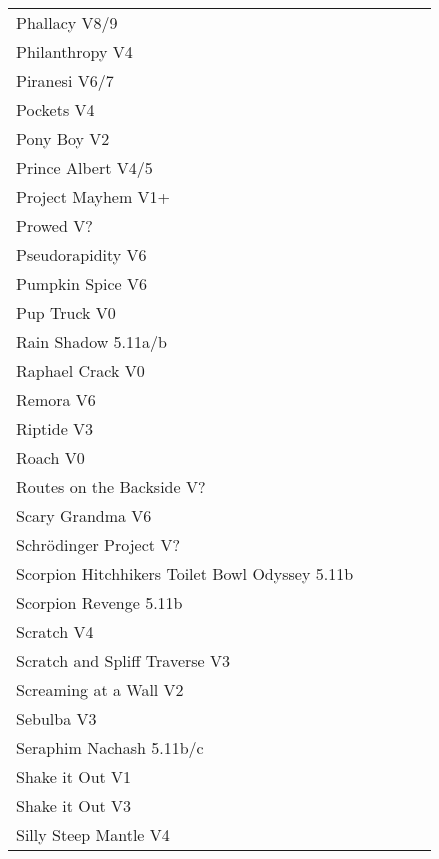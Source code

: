 \begin{flushleft}
\begin{center}
\begin{supertabular}{p{0.76\linewidth}p{0.08\linewidth}}
Phallacy V8/9 & \pageref{rt:Phallacy} \\
Philanthropy V4 & \pageref{rt:Philanthropy} \\
Piranesi V6/7 & \pageref{rt:Piranesi} \\
Pockets V4 & \pageref{rt:Pockets} \\
Pony Boy V2 & \pageref{rt:Pony Boy} \\
Prince Albert V4/5 & \pageref{rt:Prince Albert} \\
Project Mayhem V1+ & \pageref{rt:Project Mayhem} \\
Prowed V? & \pageref{vr:Prowed} \\
Pseudorapidity V6 & \pageref{rt:Pseudorapidity} \\
Pumpkin Spice V6 & \pageref{rt:Pumpkin Spice} \\
Pup Truck V0 & \pageref{rt:Pup Truck} \\
Rain Shadow 5.11a/b & \pageref{rt:Rain Shadow} \\
Raphael Crack V0 & \pageref{rt:Raphael Crack} \\
Remora V6 & \pageref{rt:Remora} \\
Riptide V3 & \pageref{rt:Riptide} \\
Roach V0 & \pageref{rt:Roach} \\
Routes on the Backside V? & \pageref{rt:Backside of Office} \\
Scary Grandma V6 & \pageref{rt:Scary Grandma} \\
Schrödinger Project V? & \pageref{rt:Schrödinger Project} \\
Scorpion Hitchhikers Toilet Bowl Odyssey 5.11b & \pageref{rt:Scorpion Hitchhikers Toilet Bowl Odyssey} \\
Scorpion Revenge 5.11b & \pageref{rt:Scorpion Revenge} \\
Scratch V4 & \pageref{rt:Scratch} \\
Scratch and Spliff Traverse V3 & \pageref{rt:Scratch and Spliff Traverse} \\
Screaming at a Wall V2 & \pageref{rt:Screaming at a Wall} \\
Sebulba V3 & \pageref{vr:Sebulba} \\
Seraphim Nachash 5.11b/c & \pageref{rt:Seraphim Nachash} \\
Shake it Out V1 & \pageref{rt:Shake it Out Frank} \\
Shake it Out V3 & \pageref{vr:Shake it Out} \\
Silly Steep Mantle V4 & \pageref{rt:Silly Steep Mantle} \\

\end{supertabular}
\end{center}
\end{flushleft}
